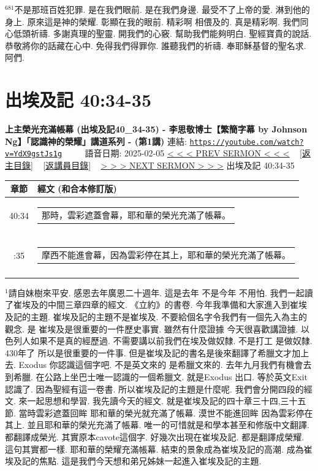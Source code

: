 \documentclass{book}
\begin{document}
$^{681}$不是那班百姓犯罪.
是在我們眼前.
是在我們身邊.
最受不了上帝的愛.
淋到他的身上.
原來這是神的榮耀.
彰顯在我的眼前.
精彩啊 相偎及的.
真是精彩啊.
我們同心低頭祈禱.
多謝真理的聖靈.
開我們的心竅.
幫助我們能夠明白.
聖經寶貴的說話.
恭敬將你的話藏在心中.
免得我們得罪你.
誰聽我們的祈禱.
奉耶穌基督的聖名求.
阿們.
\newpage



\section{出埃及記 40:34-35}
\label{sec:YdX9gstJs1g}
\textbf{上主榮光充滿帳幕 (出埃及記40\_34-35) - 李思敬博士【繁簡字幕 by Johnson Ng】「認識神的榮耀」講道系列 - (第1講)}
\newline
\newline
連結: \href{https://youtube.com/watch?v=YdX9gstJs1g}{\texttt{https://youtube.com/watch?v=YdX9gstJs1g}} ~~~~ 語音日期: 2025-02-05
\newline
\newline
\hyperref[sec:sg1ydBAtBWw]{< < < PREV SERMON < < <}
~
\hyperlink{toc}{[返主目錄]}
~
\hyperref[ch:preacher5]{[返講員目錄]}
~
\hyperref[sec:l8BFPdIOADs]{> > > NEXT SERMON > > >}
\newline
\newline
出埃及記 40:34-35
\newline
\begin{longtable}{cl}
\hline
\hline
章節 & 經文 (和合本修訂版)\\
\hline
40:34 & \begin{tabularx}{0.7\textwidth}{X} 那時，雲彩遮蓋會幕，耶和華的榮光充滿了帳幕。 \end{tabularx} \\ \\ \relax
40:35 & \begin{tabularx}{0.7\textwidth}{X} 摩西不能進會幕，因為雲彩停在其上，耶和華的榮光充滿了帳幕。 \end{tabularx} \\ \\
[1ex]
\hline
\hline
\end{longtable}
$^{1}$請自妹樹來平安.
感恩去年廣恩二十週年.
這是去年 不是今年 不用怕.
我們一起讀了崔埃及的中間三章四章的經文.
《立約》的書卷.
今年我準備和大家進入到崔埃及記的主題.
崔埃及記的主題不是崔埃及.
不要給個名字令我們有一個先入為主的觀念.
是 崔埃及是很重要的一件歷史事實.
雖然有什麼證據 今天很喜歡講證據.
以色列人如果不是真的經歷過.
不需要講以前我們在埃及做奴隸.
不是打工 是做奴隸.
430年了 所以是很重要的一件事.
但是崔埃及記的書名是後來翻譯了希臘文才加上去.
Exodus 你認識這個字吧.
不是英文來的 是希臘文來的.
去年九月我們有機會去到希臘.
在公路上坐巴士唯一認識的一個希臘文.
就是Exodus 出口.
等於英文Exit 認識了.
因為聖經有這一卷書.
所以崔埃及記的主題是什麼呢.
我們會分開四段的經文.
來一起思想和學習.
我先讀今天的經文.
就是崔埃及記的四十章三十四,三十五節.
當時雲彩遮蓋回眸 耶和華的榮光就充滿了帳幕.
漠世不能進回眸 因為雲彩停在其上.
並且耶和華的榮光充滿了帳幕.
唯一的可惜就是和學本甚至和修版中文翻譯.
都翻譯成榮光.
其實原本cavote這個字.
好幾次出現在崔埃及記.
都是翻譯成榮耀.
這句其實都一樣.
耶和華的榮耀充滿帳幕.
結束的景象成為崔埃及記的高潮.
成為崔埃及記的焦點.
這是我們今天想和弟兄姊妹一起進入崔埃及記的主題.
\end{document}
